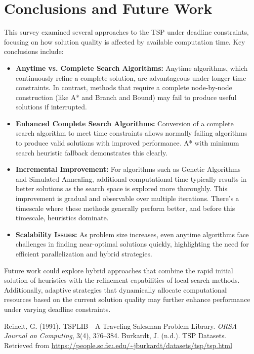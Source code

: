 \documentclass[11pt]{article}
\begin{document}
	\section{Conclusions and Future Work}
	This survey examined several approaches to the TSP under deadline constraints, focusing on how solution quality is affected by available computation time. Key conclusions include:
	\begin{itemize}[noitemsep]
		\item \textbf{Anytime vs. Complete Search Algorithms:} Anytime algorithms, which continuously refine a complete solution, are advantageous under longer time constraints. In contrast, methods that require a complete node-by-node construction (like A* and Branch and Bound) may fail to produce useful solutions if interrupted.
		\item \textbf {Enhanced Complete Search Algorithms:} Conversion of a complete search algorithm to meet time constraints allows normally failing algorithms to produce valid solutions with improved performance. A* with minimum search heuristic fallback demonstrates this clearly.
		\item \textbf{Incremental Improvement:} For algorithms such as Genetic Algorithms and Simulated Annealing, additional computational time typically results in better solutions as the search space is explored more thoroughly. This improvement is gradual and observable over multiple iterations. There's a timescale where these methods generally perform better, and before this timescale, heuristics dominate.
		\item \textbf{Scalability Issues:} As problem size increases, even anytime algorithms face challenges in finding near-optimal solutions quickly, highlighting the need for efficient parallelization and hybrid strategies.
	\end{itemize}
	
	Future work could explore hybrid approaches that combine the rapid initial solution of heuristics with the refinement capabilities of local search methods. Additionally, adaptive strategies that dynamically allocate computational resources based on the current solution quality may further enhance performance under varying deadline constraints.
	
	\begin{thebibliography}{9}
		Reinelt, G. (1991). TSPLIB—A Traveling Salesman Problem Library. \emph{ORSA Journal on Computing}, 3(4), 376--384.
		Burkardt, J. (n.d.). TSP Datasets. Retrieved from \url{https://people.sc.fsu.edu/~jburkardt/datasets/tsp/tsp.html}
	\end{thebibliography}
	
\end{document}
